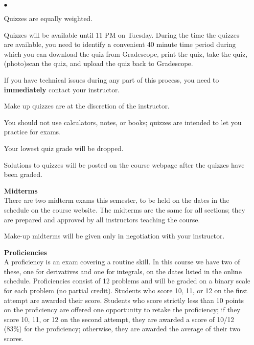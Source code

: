 \documentclass[12pt]{article}
\renewcommand{\emph}[1]{\textsf{\textbf{#1}}}
\newcommand{\localhead}[1]{\par\smallskip\textbf{#1}\nobreak\\}%
\def\heading#1{\localhead{\large\emph{#1}}}
\newenvironment{clist}%
{\bgroup\parskip 0pt\begin{list}{$\bullet$}{\partopsep 4pt\topsep 0pt\itemsep -2pt}}%
{\end{list}\egroup}%
\begin{document}
\begin{clist}
\item Quizzes are equally weighted.%

\item Quizzes will be available until 11 PM on Tuesday. During the time the quizzes are available, you need to identify a convenient 40 minute time period during which you can download the quiz from  Gradescope, print the quiz, take the quiz, (photo)scan the quiz, and upload the quiz back to Gradescope.
\item If you have technical issues during any part of this process, you need to \emph{immediately} contact your instructor.
\item Make up quizzes are at the discretion of the instructor.
\item You should not use calculators, notes, or books; quizzes are intended to let you practice for exams.
\item Your lowest quiz grade will be dropped. 
\end{clist}

Solutions to quizzes will be posted on the course webpage after the quizzes have been graded.

\heading{Midterms}
There are two midterm exams this semester, to be held on the dates in the schedule on the course website.  The midterms are the same for all sections; they are prepared and approved by all instructors teaching the course. 

Make-up midterms will be given only in negotiation with your instructor.

\heading{Proficiencies}
A proficiency is an exam covering a routine skill.  In this course we have two of these, one for derivatives and one for integrals, on the dates listed in the online schedule.  Proficiencies consist of 12 problems and will be graded on a binary scale for each problem (no partial credit). Students who score 10, 11, or 12 on the first attempt are awarded their score. Students who score strictly less than 10 points on the proficiency are offered one opportunity to retake the proficiency; if they score 10, 11, or 12 on the second attempt, they are awarded a score of 10/12 (83\%) for the proficiency; otherwise, they are awarded the average of their two scores.   %
\end{document}
